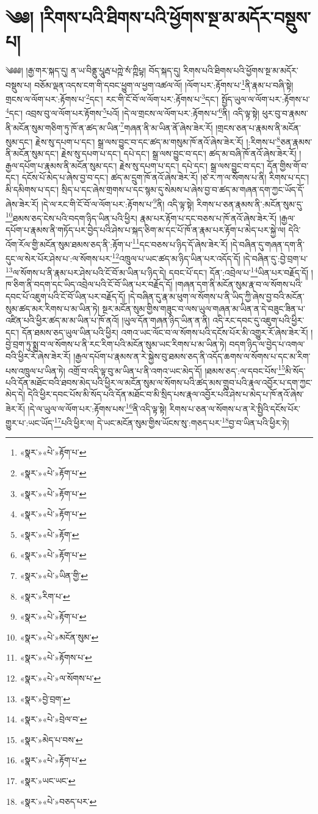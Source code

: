\chapter{༄༅། །རིགས་པའི་ཐིགས་པའི་ཕྱོགས་སྔ་མ་མདོར་བསྡུས་པ།}༄༅༅། །རྒྱ་གར་སྐད་དུ། ན་ཡ་བིནྡུ་པཱུརྦ་པཀྵེ་སཾ་ཀྵིཔྟ། བོད་སྐད་དུ། རིགས་པའི་ཐིགས་པའི་ཕྱོགས་སྔ་མ་མདོར་བསྡུས་པ། བཅོམ་ལྡན་འདས་ངག་གི་དབང་ཕྱུག་ལ་ཕྱག་འཚལ་ལོ། །ལོག་པར་:རྟོགས་པ་\footnote{«སྣར་»«པེ་»རྟོག་པ་}ནི་རྣམ་པ་བཞི་སྟེ། གྲངས་ལ་ལོག་པར་:རྟོགས་པ་\footnote{«སྣར་»«པེ་»རྟོག་པ་}དང་། རང་གི་ངོ་བོ་ལ་ལོག་པར་:རྟོགས་པ་\footnote{«སྣར་»«པེ་»རྟོག་པ་}དང་། སྤྱོད་ཡུལ་ལ་ལོག་པར་:རྟོགས་པ་\footnote{«སྣར་»«པེ་»རྟོག་པ་}དང་། འབྲས་བུ་ལ་ལོག་པར་རྟོགས་\footnote{«སྣར་»«པེ་»རྟོག་}པའོ། །དེ་ལ་གྲངས་ལ་ལོག་པར་:རྟོགས་པ་\footnote{«སྣར་»«པེ་»རྟོག་པ་}ནི། འདི་ལྟ་སྟེ། ཕུར་བུ་བ་རྣམས་ནི་མངོན་སུམ་གཅིག་ཏུ་ཁོ་ན་ཚད་མ་ཡིན་\footnote{«སྣར་»«པེ་»ཡིན་གྱི་}གཞན་ནི་མ་ཡིན་ནོ་ཞེས་ཟེར་རོ། །གྲངས་ཅན་པ་རྣམས་ནི་མངོན་སུམ་དང་། རྗེས་སུ་དཔག་པ་དང་། སྒྲ་ལས་བྱུང་བ་དང་ཚད་མ་གསུམ་ཁོ་ནའོ་ཞེས་ཟེར་རོ། །:རིགས་པ་\footnote{«སྣར་»རིག་པ་}ཅན་རྣམས་ནི་མངོན་སུམ་དང་། རྗེས་སུ་དཔག་པ་དང་། དཔེ་དང་། སྒྲ་ལས་བྱུང་བ་དང་། ཚད་མ་བཞི་ཁོ་ནའོ་ཞེས་ཟེར་རོ། །རྒྱལ་དཔོག་པ་རྣམས་ནི་མངོན་སུམ་དང་། རྗེས་སུ་དཔག་པ་དང་། དཔེ་དང་། སྒྲ་ལས་བྱུང་བ་དང་། དོན་གྱིས་གོ་བ་དང་། དངོས་པོ་མེད་པ་ཞེས་བྱ་བ་དང་། ཚད་མ་དྲུག་ཁོ་ནའོ་ཞེས་ཟེར་རོ། །ཙ་ར་ཀ་ལ་སོགས་པ་ནི། རིགས་པ་དང་། མི་དམིགས་པ་དང་། སྲིད་པ་དང་ཞེས་གྲགས་པ་དང་སྙམ་དུ་སེམས་པ་ཞེས་བྱ་བ་ཚད་མ་གཞན་དག་ཀྱང་ཡོད་དོ་ཞེས་ཟེར་རོ། །དེ་ལ་རང་གི་ངོ་བོ་ལ་ལོག་པར་:རྟོགས་པ་\footnote{«སྣར་»«པེ་»རྟོག་པ་}ནི། འདི་ལྟ་སྟེ། རིགས་པ་ཅན་རྣམས་ནི་:མངོན་སུམ་དུ་\footnote{«སྣར་»«པེ་»མངོན་སུམ་}ཐམས་ཅད་ངེས་པའི་བདག་ཉིད་ཡིན་པའི་ཕྱིར། རྣམ་པར་རྟོག་པ་དང་བཅས་པ་ཁོ་ནའོ་ཞེས་ཟེར་རོ། །རྒྱལ་དཔོག་པ་རྣམས་ནི་གཏོད་པར་བྱེད་པའི་ཤེས་པ་སྐད་ཅིག་མ་དང་པོ་ཁོ་ན་རྣམ་པར་རྟོག་པ་མེད་པར་སྐྱེ་ལ། དེའི་འོག་རོལ་གྱི་མངོན་སུམ་ཐམས་ཅད་ནི་:རྟོག་པ་\footnote{«སྣར་»«པེ་»རྟོགས་པ་}དང་བཅས་པ་ཉིད་དོ་ཞེས་ཟེར་རོ། །དེ་བཞིན་དུ་གཞན་དག་ནི་དུང་ལ་སེར་པོར་ཤེས་པ་:ལ་སོགས་པར་\footnote{«སྣར་»«པེ་»ལ་སོགས་པ་}འཁྲུལ་པ་ཡང་ཚད་མ་ཉིད་ཡིན་པར་འདོད་དོ། །དེ་བཞིན་དུ་:བྱེ་བྲག་པ་\footnote{«སྣར་»བྱེ་བྲག་}ལ་སོགས་པ་ནི་རྣམ་པར་ཤེས་པའི་ངོ་བོ་མ་ཡིན་པ་ཉིད་དེ། དབང་པོ་དང་། དོན་:འབྲེལ་པ་\footnote{«སྣར་»«པེ་»བྲེལ་བ་}ཡིན་པར་བརྗོད་དོ། །ཁ་ཅིག་ནི་བདག་དང་ཡིད་འབྲེལ་པའི་ངོ་བོ་ཡིན་པར་བརྗོད་དོ། །གཞན་དག་ནི་མངོན་སུམ་རྣ་བ་ལ་སོགས་པའི་དབང་པོ་འཇུག་པའི་ངོ་བོ་ཡིན་པར་བརྗོད་དོ། །དེ་བཞིན་དུ་རྣ་མ་ཕུག་ལ་སོགས་པ་ནི་ཡིད་ཀྱི་ཞེས་བྱ་བའི་མངོན་སུམ་ཚད་མར་རིགས་པ་མ་ཡིན་ཏེ། སྔར་མངོན་སུམ་གྱིས་གཟུང་བ་ལས་ཡུལ་གཞན་མ་ཡིན་ན་དེ་བཟུང་ཟིན་པ་འཛིན་པའི་ཕྱིར་ཚད་མ་མ་ཡིན་པ་ཁོ་ནའོ། །ཡུལ་དོན་གཞན་ཉིད་ཡིན་ན་ནི། འདི་རང་དབང་དུ་འཇུག་པའི་ཕྱིར་དང་། དོན་ཐམས་ཅད་ཡུལ་ཡིན་པའི་ཕྱིར། འགའ་ཡང་ལོང་བ་ལ་སོགས་པའི་དངོས་པོར་མི་འགྱུར་རོ་ཞེས་ཟེར་རོ། །བྱེ་བྲག་ཏུ་སྨྲ་བ་ལ་སོགས་པ་ནི་རང་རིག་པའི་མངོན་སུམ་ཡང་རིགས་པ་མ་ཡིན་ཏེ། བདག་ཉིད་ལ་བྱེད་པ་འགལ་བའི་ཕྱིར་རོ་ཞེས་ཟེར་རོ། །རྒྱལ་དཔོག་པ་རྣམས་ན་རེ་སྐྱེས་བུ་ཐམས་ཅད་ནི་འདོད་ཆགས་ལ་སོགས་པ་དང་མ་རིག་པས་འཁྲུལ་པ་ཡིན་ཏེ། འགྲོ་བ་འདི་ལྟ་བུ་མ་ཡིན་པ་ནི་འགའ་ཡང་མེད་དོ། །ཐམས་ཅད་:ལ་དབང་པོས་\footnote{«སྣར་»མེད་པ་བས་}མི་སོད་པའི་དོན་མཐོང་བའི་ཐབས་མེད་པའི་ཕྱིར་ལ་མངོན་སུམ་ལ་སོགས་པའི་ཚད་མས་གྲུབ་པའི་རྣལ་འབྱོར་པ་དག་ཀྱང་མེད་དེ། དེའི་ཕྱིར་དབང་པོས་མི་སོད་པའི་དོན་མཐོང་བ་མི་སྲིད་པས་རྣལ་འབྱོར་པའི་ཤེས་པ་མེད་པ་ཁོ་ནའོ་ཞེས་ཟེར་རོ། །དེ་ལ་ཡུལ་ལ་ལོག་པར་:རྟོགས་པས་\footnote{«སྣར་»«པེ་»རྟོག་པ་}ནི་འདི་ལྟ་སྟེ། རིགས་པ་ཅན་ལ་སོགས་པ་ན་རེ་སྤྱིའི་དངོས་པོར་གྱུར་པ་:ཡང་ཡོད་\footnote{«སྣར་»ཡང་ཡང་}པའི་ཕྱིར་ལ། དེ་ཡང་མངོན་སུམ་གྱིས་ཡོངས་སུ་:གཅད་པར་\footnote{«སྣར་»«པེ་»བཅད་པར་}བྱ་བ་ཡིན་པའི་ཕྱིར་ཏེ། 